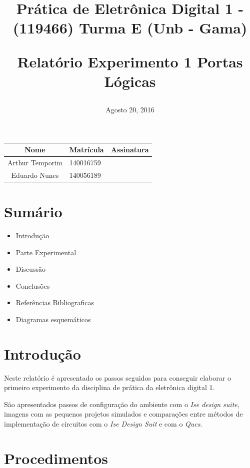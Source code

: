 \documentclass[12pts]{article}
\title{
	Prática de Eletrônica Digital 1 - (119466)
	\singlespacing
		Turma E (Unb - Gama)
	\singlespacing
	\begin{midpage}
	\begin {large}
		Relatório Experimento 1
		\singlespace
		Portas Lógicas
	\end {large}
	\end{midpage}
}
\date{Agosto 20, 2016}
\begin{document}
\maketitle	
\begin{center}

\begin{tabular}{|c|l|r|}
\hline
Nome & Matrícula & Assinatura\\
\hline
Arthur Temporim & 140016759 & \\
\hline	
Eduardo Nunes & 140056189 & \\
\hline	
\end{tabular}

\end{center}


\newpage

\section{Sumário}

\begin{itemize}
	\item Introdução
	\singlespacing
	\item Parte Experimental
	\singlespacing
	\item Discussão
	\singlespacing
	\item Conclusões 
	\singlespacing
	\item Referências Bibliograficas
	\singlespacing
	\item Diagramas esquemáticos
\end{itemize}

\newpage


\section{Introdução}

	Neste relatório é apresentado os passos seguidos para conseguir elaborar o primeiro experimento da disciplina de prática da eletrônica digital 1.

	São apresentados passos de configuração do ambiente com o \textit{Ise design suite}, imagens com as pequenos projetos simulados e comparações entre métodos de implementação de circuitos com o \textit{Ise Design Suit} e com o \textit{Qucs}.

\section{Procedimentos}

\end{document}
